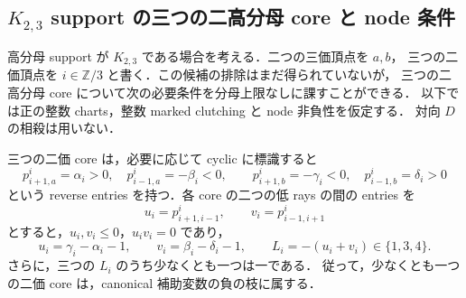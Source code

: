 \subsection{\texorpdfstring{$K_{2,3}$}{K2,3} support の三つの二高分母 core と node 条件}
\label{kn14:section}

高分母 support が $K_{2,3}$ である場合を考える．二つの三価頂点を $a,b$，
三つの二価頂点を $i\in\mathbb Z/3$ と書く．この候補の排除はまだ得られていないが，
三つの二高分母 core について次の必要条件を分母上限なしに課すことができる．
以下では正の整数 charts，整数 marked clutching と node 非負性を仮定する．
対向 $D$ の相殺は用いない．

\begin{proposition}
\label{kn14:reduction}
三つの二価 core は，必要に応じて cyclic に標識すると
\[
 p^i_{i+1,a}=\alpha_i>0,\quad p^i_{i-1,a}=-\beta_i<0,
 \qquad
 p^i_{i+1,b}=-\gamma_i<0,\quad p^i_{i-1,b}=\delta_i>0
\]
という reverse entries を持つ．各 core の二つの低 rays の間の entries を
\[
 u_i=p^i_{i+1,i-1},\qquad v_i=p^i_{i-1,i+1}
\]
とすると，$u_i,v_i\leq0$，$u_iv_i=0$ であり，
\[
 u_i=\gamma_i-\alpha_i-1,\qquad
 v_i=\beta_i-\delta_i-1,\qquad
 L_i=-(u_i+v_i)\in\{1,3,4\}.
\]
さらに，三つの $L_i$ のうち少なくとも一つは一である．
従って，少なくとも一つの二価 core は，canonical 補助変数の負の枝に属する．
\end{proposition}

